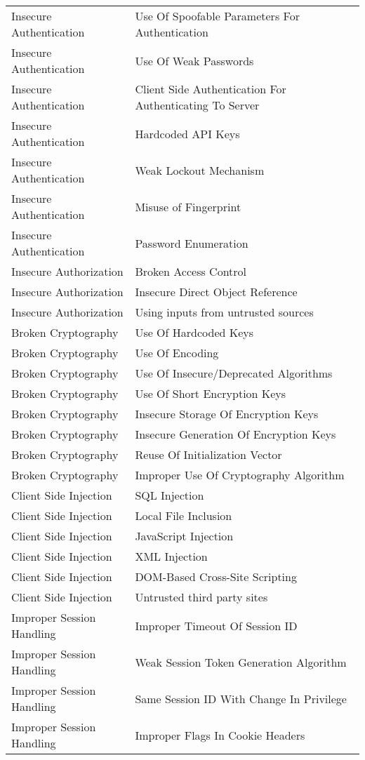 \begin{longtable}{p{} | p{} }
Insecure Authentication& Use Of Spoofable Parameters For Authentication\\
Insecure Authentication& Use Of Weak Passwords\\
Insecure Authentication& Client Side Authentication For Authenticating To Server\\
Insecure Authentication& Hardcoded API Keys\\
Insecure Authentication& Weak Lockout Mechanism\\
Insecure Authentication& Misuse of Fingerprint\\
Insecure Authentication& Password Enumeration\\
Insecure Authorization& Broken Access Control\\
Insecure Authorization& Insecure Direct Object Reference\\
Insecure Authorization& Using inputs from untrusted sources\\
Broken Cryptography& Use Of Hardcoded Keys\\
Broken Cryptography& Use Of Encoding\\
Broken Cryptography& Use Of Insecure/Deprecated Algorithms\\
Broken Cryptography& Use Of Short Encryption Keys\\
Broken Cryptography& Insecure Storage Of Encryption Keys\\
Broken Cryptography& Insecure Generation Of Encryption Keys\\
Broken Cryptography& Reuse Of Initialization Vector\\
Broken Cryptography& Improper Use Of Cryptography Algorithm\\
Client Side Injection& SQL Injection\\
Client Side Injection& Local File Inclusion\\
Client Side Injection& JavaScript Injection\\
Client Side Injection& XML Injection\\
Client Side Injection& DOM-Based Cross-Site Scripting\\
Client Side Injection& Untrusted third party sites\\
Improper Session Handling& Improper Timeout Of Session ID\\
Improper Session Handling& Weak Session Token Generation Algorithm\\
Improper Session Handling& Same Session ID With Change In Privilege\\
Improper Session Handling& Improper Flags In Cookie Headers\\

\end{longtable}
